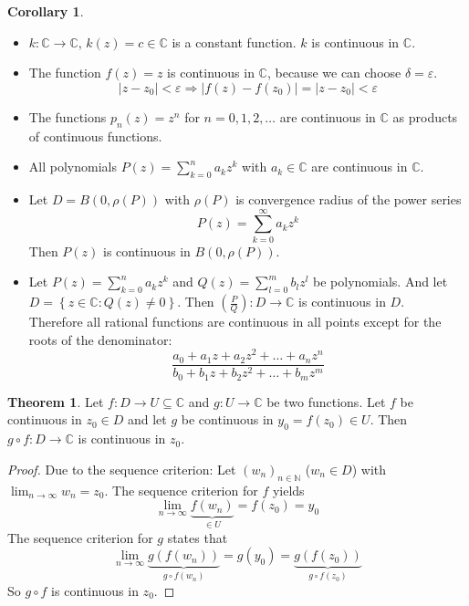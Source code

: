 \documentclass[a4paper,landscape,twocolumn]{article}
\theoremstyle{definition}
\newtheorem{theorem}{Theorem}
\newtheorem{cor}{Corollary}
\newcommand\set[1]{\left\{#1\right\}}
\newcommand\abs[1]{\left|#1\right|}
\newcommand\seq[1]{{\left(#1\right)}_{n \in \mathbb N}}
\begin{document}
\begin{cor}
  \hfill{}
  \begin{itemize}
    \item $k: \mathbb C \to \mathbb C$, $k(z) = c \in \mathbb C$ is a constant function.
      $k$ is continuous in $\mathbb C$.
    \item The function $f(z) = z$ is continuous in $\mathbb C$, because we can choose $\delta = \varepsilon$.
      \[ \abs{z - z_0} < \varepsilon \Rightarrow \abs{f(z) - f(z_0)} = \abs{z - z_0} < \varepsilon \]
    \item The functions $p_n(z) = z^n$ for $n = 0,1,2,\ldots$ are continuous in $\mathbb C$ as products of continuous functions.
    \item All polynomials $P(z) = \sum_{k=0}^n a_k z^k$ with $a_k \in \mathbb C$ are continuous in $\mathbb C$.
    \item Let $D = B(0, \rho(P))$ with $\rho(P)$ is convergence radius of the power series
      \[ P(z) = \sum_{k=0}^\infty a_k z^k \]
      Then $P(z)$ is continuous in $B(0, \rho(P))$.
    \item Let $P(z) = \sum_{k=0}^n a_k z^k$ and $Q(z) = \sum_{l=0}^m b_l z^l$ be polynomials.
      And let $D = \set{z \in \mathbb C: Q(z) \neq 0}$. Then $\left(\frac PQ\right): D \to \mathbb C$
      is continuous in $D$. \\
      Therefore all rational functions are continuous in all points except for the roots of the denominator:
      \[ \frac{a_0 + a_1 z + a_2 z^2 + \ldots + a_n z^n}{b_0 + b_1 z + b_2 z^2 + \ldots + b_m z^m} \]
  \end{itemize}
\end{cor}

\begin{theorem}
  Let $f: D \to U \subseteq \mathbb C$ and $g: U \to \mathbb C$ be two functions.
  Let $f$ be continuous in $z_0 \in D$ and let $g$ be continuous in $y_0 = f(z_0) \in U$.
  Then $g \circ f: D \to \mathbb C$ is continuous in $z_0$.
\end{theorem}
\begin{proof}
  Due to the sequence criterion: Let $\seq{w_n}$ ($w_n \in D$) with $\lim_{n\to\infty} w_n = z_0$.
  The sequence criterion for $f$ yields
  \[ \lim_{n\to\infty} \underbrace{f(w_n)}_{\in U} = f(z_0) = y_0 \]
  The sequence criterion for $g$ states that
  \[ \lim_{n\to\infty} \underbrace{g(f(w_n))}_{g \circ f(w_n)} = g(y_0) = \underbrace{g(f(z_0))}_{g \circ f(z_0)} \]
  So $g \circ f$ is continuous in $z_0$.
\end{proof}
\end{document}
